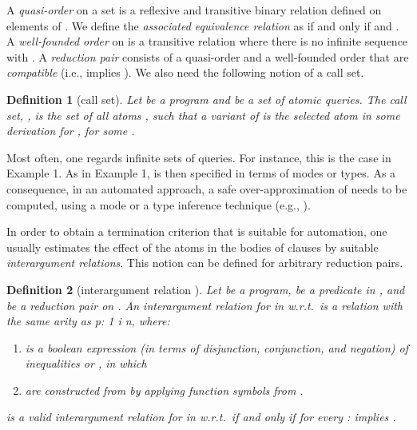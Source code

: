 \documentclass[envcountsame]{tlp}
\newcounter{ex:der-lastsymconsctr}
\newtheorem{definition}{Definition}
\begin{document}
A
\emph{quasi-order} on a set  is a reflexive and transitive binary relation
 defined on elements of . We define the \emph{associated equivalence
relation}  as  if and only if  and .
A \emph{well-founded order} on  is a transitive relation  where there is no
infinite sequence  with . A \emph{reduction pair}
 consists of a quasi-order  and a well-founded order 
that are \emph{compatible} (i.e.,  implies ).
We also need the following notion of a call set.

\begin{definition}[call set]\label{def:callset}
Let  be a program and  be a set of atomic queries. The \emph{call
set}, , is the set of all atoms , such that a variant of
 is the selected atom in some derivation for , for some .
\end{definition}

Most often, one regards infinite sets  of queries. For instance,
this is the case in Example 1. As in Example 1,  is then specified in 
terms of modes or types. As a consequence, in an automated approach, a safe over-approximation
of  needs to be computed, using a mode or a type inference
technique (e.g.,
\cite{Bruynoogheetal05,GallagherHB05,HeatonACK00,Janssensetal92}).

In order to obtain a termination criterion that is
suitable for automation, one usually estimates the effect of the atoms in the
bodies of clauses
by suitable \emph{interargument relations}. This notion can be defined for arbitrary
reduction pairs.


\begin{definition}[interargument relation
\cite{DeSchreyeSerebrenik01}]
\label{def:interargument} Let  be a program,  be a
predicate in , and  be a reduction pair on . An
\emph{interargument relation} for  in  w.r.t.\  is a relation
 with the same arity as p:
1 \leq i \leq n, where:
\begin{enumerate}
\item[-]  is a boolean expression (in terms of
disjunction, conjunction, and negation) of inequalities  or ,
in which
\item[-]  are constructed from  by applying 
function symbols from .
\end{enumerate}
 is a \emph{valid} interargument relation for  in  w.r.t.\
 if and only if for every :  implies .
\end{definition}
\end{document}
